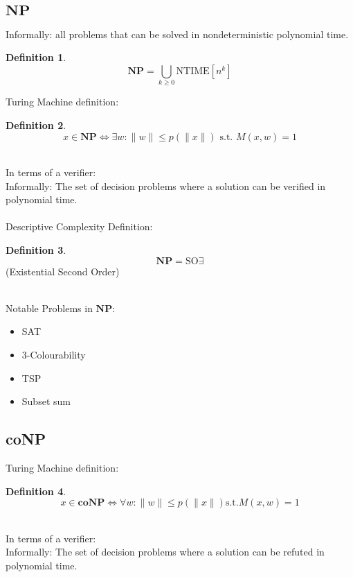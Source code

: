 \documentclass[]{article}
\theoremstyle{definition}
\newtheorem{definition}{Definition}[section]
\begin{document}
\subsection{$\mathbf{NP}$}
\label{sec:NP}
Informally: all problems that can be solved in nondeterministic polynomial time.
\begin{definition}
	$$\mathbf{NP} = \bigcup_{k\geq 0} \hyperref[sec:NTIME]{\text{NTIME}}[n^{k}]$$
\end{definition}
$ $
\\
Turing Machine definition:
\begin{definition}
	$$x \in \mathbf{NP}\iff \exists w : \|w\| \leq p(\|x\|) \text{ s.t. } M(x, w) = 1$$
\end{definition}
$ $
\\
\\
In terms of a verifier:
\\
Informally: The set of decision problems where a solution can be verified in polynomial time.
\\
\\
Descriptive Complexity Definition:
\begin{definition}
	$$\mathbf{NP} = \text{SO}\exists$$
	(Existential Second Order)
\end{definition}
$ $
\\
\\
Notable Problems in $\mathbf{NP}$:
\begin{itemize}
	\item SAT
	\item 3-Colourability
	\item TSP
	\item Subset sum
\end{itemize}
\subsection{coNP}
\label{sec:coNP}
Turing Machine definition:
\begin{definition}
	$$x \in \mathbf{coNP}\iff \forall w : \|w\| \leq p(\|x\|) \text{s.t.} M(x, w) = 1$$
\end{definition}
$ $
\\
\\
In terms of a verifier:
\\
Informally: The set of decision problems where a solution can be refuted in polynomial time.
\end{document}
